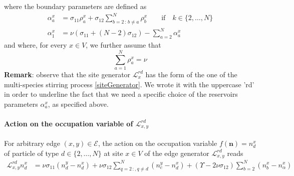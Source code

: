 \documentclass[10pt]{article}
\numberwithin{equation}{section}
\numberwithin{equation}{subsection}
\begin{document}
where the boundary parameters are defined as
\begin{equation}\label{boundaryParamRD}
	\begin{split}
		\alpha_{a}^{x}&=\sigma_{11}\rho_{a}^{x}+\sigma_{12}\sum_{b=2\,:\,b\neq a}^{N}\rho_{b}^{x}\qquad \text{if} \quad k\in \{2,\ldots,N\}\\
		\alpha_{1}^{x}&=\nu\left(\sigma_{11}+(N-2)\sigma_{12}\right)-\sum_{a=2}^{N}\alpha_{a}^{x}
	\end{split}
\end{equation}
and where, for every $x\in V$, we further assume that
\begin{equation}
	\sum_{a=1}^{N}\rho_{a}^{x}=\nu
\end{equation}
\textbf{Remark}: observe that the site generator $\mathcal{L}_{x}^{rd}$ has the form of the one of the multi-species stirring process \eqref{siteGenerator}. We wrote it with the uppercase 'rd' in order to underline the fact that we need a specific choice of the reservoirs parameters $\alpha_{a}^{x}$, as specified above. 
\paragraph{Action on the occupation variable of $\mathcal{L}_{x,y}^{rd}$}
For arbitrary edge $(x,y)\in \mathcal{E}$, the action on the occupation variable $f(\bm{n})=n_{d}^{x}$ of particle of type $d\in \{2,\ldots,N\}$ at site $x\in V $ of the edge generator $\mathcal{L}_{x,y}^{rd}$ reads
\begin{equation}\label{actionGraphRD}
	\begin{split}
		\mathcal{L}_{x,y}^{rd}n_{d}^{x}&=\nu \sigma_{11}(n_{d}^{y}-n_{d}^{x})+\nu\sigma_{12}\sum_{q=2\,:	,q\neq d}^{N}(n_{c}^{y}-n_{d}^{x})+(\Upsilon-2\nu\sigma_{12})\sum_{b=2}^{N}(n_{b}^{x}-n_{\alpha}^{x})
	\end{split}
\end{equation}
\end{document}
